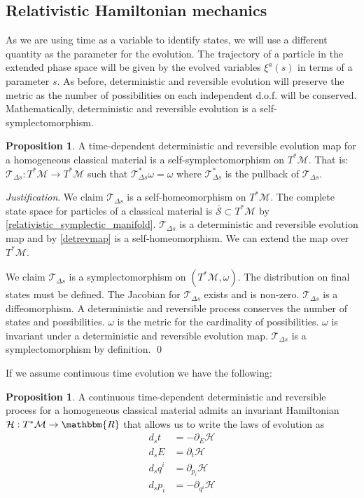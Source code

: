 \documentclass[aps,pra,10pt,twocolumn,floatfix,nofootinbib]{revtex4-1}
\numberwithin{equation}{section}
\theoremstyle{definition}
\newtheorem{prop}[equation]{Proposition}
\newenvironment{justification}{\emph{Justification}.}{\qed}
\begin{document}
\subsection{Relativistic Hamiltonian mechanics}

As we are using time as a variable to identify states, we will use a different quantity as the parameter for the evolution. The trajectory of a particle in the extended phase space will be given by the evolved variables $\xi^a(s)$ in terms of a parameter $s$. As before, deterministic and reversible evolution will preserve the metric as the number of possibilities on each independent d.o.f. will be conserved. Mathematically, deterministic and reversible evolution is a self-symplectomorphism.

\begin{prop}\label{relativistic_canonical_transformation}
	A time-dependent deterministic and reversible evolution map for a homogeneous classical material is a self-symplectomorphism on $T^*\mathcal{M}$. That is: $\mathcal{T}_{\Delta s}: T^*\mathcal{M} \rightarrow T^*\mathcal{M}$ such that $\mathcal{T}_{\Delta s}^*\omega = \omega$ where $\mathcal{T}_{\Delta s}^*$ is the pullback of $\mathcal{T}_{\Delta s}$.
\end{prop}

\begin{justification}
	We claim $\mathcal{T}_{\Delta s}$ is a self-homeomorphism on $T^*\mathcal{M}$. The complete state space for particles of a classical material is $\bar{\mathcal{S}} \subset T^*\mathcal{M}$ by \ref{relativistic_symplectic_manifold}. $\mathcal{T}_{\Delta s}$ is a deterministic and reversible evolution map and by \ref{detrevmap} is a self-homeomorphism. We can extend the map over $T^*\mathcal{M}$.
	
	We claim $\mathcal{T}_{\Delta s}$ is a symplectomorphism on $(T^*\mathcal{M}, \omega)$. The distribution on final states must be defined. The Jacobian for $\mathcal{T}_{\Delta s}$ exists and is non-zero. $\mathcal{T}_{\Delta s}$ is a diffeomorphism. A deterministic and reversible process conserves the number of states and possibilities. $\omega$ is the metric for the cardinality of possibilities. $\omega$ is invariant under a deterministic and reversible evolution map. $\mathcal{T}_{\Delta s}$ is a symplectomorphism by definition.
\end{justification}

If we assume continuous time evolution we have the following:

\begin{prop}\label{relativistic_hamiltons_equations}
	A continuous time-dependent deterministic and reversible process for a homogeneous classical material admits an invariant Hamiltonian $\mathcal{H}: T^*\mathcal{M} \rightarrow \mathbbm{R}$ that allows us to write the laws of evolution as
	\begin{align*}
	d_{s}t &= - \partial_{E} \mathcal{H} \\
	d_{s}E &= \partial_{t} \mathcal{H} \\
	d_{s}q^i &= \partial_{p_i} \mathcal{H} \\
	d_{s}p_i &= - \partial_{q^i} \mathcal{H}
	\end{align*}
\end{prop}
\end{document}
